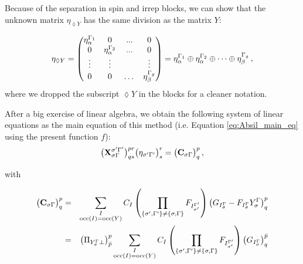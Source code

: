 \documentclass[a4paper,11pt]{article}
\begin{document}
Because of the separation in spin and irrep blocks, we can show that the unknown matrix $\eta_{\lozenge Y}$ has the same division as the matrix $Y$:

\begin{equation}\label{eq:eta_spin_irrep_blocks}
  \eta_{\lozenge Y} =
  \begin{pmatrix}
    \eta_\alpha^{\Gamma_1} & 0 & ... & 0\\
    0 & \eta_\alpha^{\Gamma_2} & ... & 0 \\
    \vdots & \vdots & & \vdots\\
    0 & 0 &\dots & \eta_\beta^{\Gamma_g}\\
  \end{pmatrix}
  = \eta_\alpha^{\Gamma_1} \oplus \eta_\alpha^{\Gamma_2} \oplus \dots \oplus \eta_\beta^{\Gamma_g}\,,
\end{equation}
where we dropped the subscript $\lozenge Y$ in the blocks for a cleaner notation.

After a big exercise of linear algebra, we obtain the following system of linear equations as the main equation of this method (i.e. Equation \eqref{eq:Absil_main_eq} using the present function $f$):
\begin{equation}
  \big( \mathbf{X}_{\sigma \Gamma}^{\sigma' {\Gamma'}} \big)^{pr}_{qs} \big( \eta_{\sigma' {\Gamma'}} \big)^r_s
  = \big( \mathbf{C}_{\sigma \Gamma} \big)^p_q\,,
\end{equation}

with

\begin{eqnarray}
  \big( \mathbf{C}_{\sigma \Gamma} \big)^p_q &=&
  \sum_{\substack{I\\\text{occ}(I) = \text{occ}(Y)}} C_I
  \left( \prod_{\{\sigma', {\Gamma'}\} \ne \{\sigma, \Gamma\}} F_{I_{\sigma'}^{\Gamma'}} \right)
  \left( G_{I_\sigma^{\Gamma}} - F_{I_\sigma^{\Gamma}} Y_\sigma^{\Gamma}  \right)^p_q\\
  &=&
  \big( \Pi_{Y_\sigma^{\Gamma} \perp} \big)^p_{\bar{p}}
  \sum_{\substack{I\\\text{occ}(I) = \text{occ}(Y)}} C_I
  \left( \prod_{\{\sigma', {\Gamma'}\} \ne \{\sigma, \Gamma\}} F_{I_{\sigma'}^{\Gamma'}} \right)
  \left( G_{I_\sigma^{\Gamma}} \right)^{\bar{p}}_q
\end{eqnarray}
\end{document}

